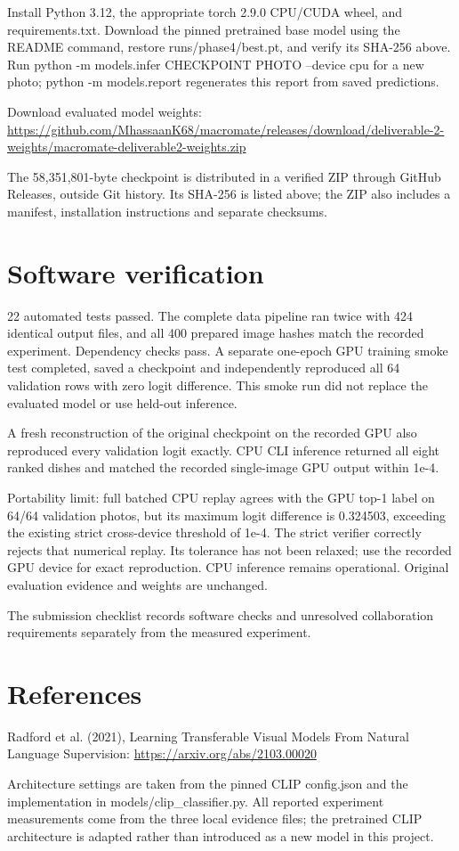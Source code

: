 \documentclass[10pt,a4paper]{article}
\begin{document}
Install Python 3.12, the appropriate torch 2.9.0 CPU/CUDA wheel, and requirements.txt. Download the pinned pretrained base model using the README command, restore runs/phase4/best.pt, and verify its SHA-256 above. Run python -m models.infer CHECKPOINT PHOTO --device cpu for a new photo; python -m models.report regenerates this report from saved predictions.

Download evaluated model weights: \url{https://github.com/MhassaanK68/macromate/releases/download/deliverable-2-weights/macromate-deliverable2-weights.zip}\par
The 58,351,801-byte checkpoint is distributed in a verified ZIP through GitHub Releases, outside Git history. Its SHA-256 is listed above; the ZIP also includes a manifest, installation instructions and separate checksums.

\section*{Software verification}
22 automated tests passed. The complete data pipeline ran twice with 424 identical output files, and all 400 prepared image hashes match the recorded experiment. Dependency checks pass. A separate one-epoch GPU training smoke test completed, saved a checkpoint and independently reproduced all 64 validation rows with zero logit difference. This smoke run did not replace the evaluated model or use held-out inference.

A fresh reconstruction of the original checkpoint on the recorded GPU also reproduced every validation logit exactly. CPU CLI inference returned all eight ranked dishes and matched the recorded single-image GPU output within 1e-4.

Portability limit: full batched CPU replay agrees with the GPU top-1 label on 64/64 validation photos, but its maximum logit difference is 0.324503, exceeding the existing strict cross-device threshold of 1e-4. The strict verifier correctly rejects that numerical replay. Its tolerance has not been relaxed; use the recorded GPU device for exact reproduction. CPU inference remains operational. Original evaluation evidence and weights are unchanged.

The submission checklist records software checks and unresolved collaboration requirements separately from the measured experiment.

\section*{References}
Radford et al. (2021), Learning Transferable Visual Models From Natural Language Supervision: \url{https://arxiv.org/abs/2103.00020}\par
Architecture settings are taken from the pinned CLIP config.json and the implementation in models/clip\_classifier.py. All reported experiment measurements come from the three local evidence files; the pretrained CLIP architecture is adapted rather than introduced as a new model in this project.
\end{document}
